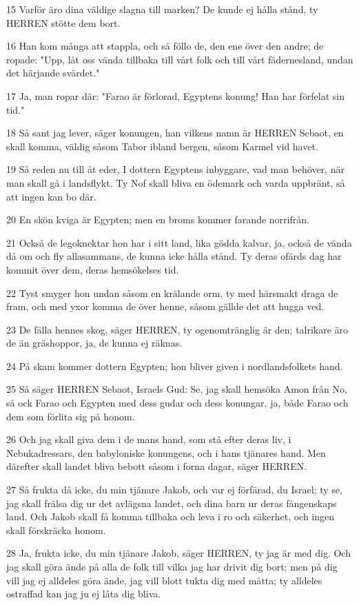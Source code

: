 \par 15 Varför äro dina väldige slagna till marken? De kunde ej hålla stånd, ty HERREN stötte dem bort.
\par 16 Han kom många att stappla, och så föllo de, den ene över den andre; de ropade: "Upp, låt oss vända tillbaka till vårt folk och till vårt fädernesland, undan det härjande svärdet."
\par 17 Ja, man ropar där: "Farao är förlorad, Egyptens konung! Han har förfelat sin tid."
\par 18 Så sant jag lever, säger konungen, han vilkens namn är HERREN Sebaot, en skall komma, väldig såsom Tabor ibland bergen, såsom Karmel vid havet.
\par 19 Så reden nu till åt eder, I dottern Egyptens inbyggare, vad man behöver, när man skall gå i landsflykt. Ty Nof skall bliva en ödemark och varda uppbränt, så att ingen kan bo där.
\par 20 En skön kviga är Egypten; men en broms kommer farande norrifrån.
\par 21 Också de legoknektar hon har i sitt land, lika gödda kalvar, ja, också de vända då om och fly allasammans, de kunna icke hålla stånd. Ty deras ofärds dag har kommit över dem, deras hemsökelses tid.
\par 22 Tyst smyger hon undan såsom en krälande orm, ty med härsmakt draga de fram, och med yxor komma de över henne, såsom gällde det att hugga ved.
\par 23 De fälla hennes skog, säger HERREN, ty ogenomtränglig är den; talrikare äro de än gräshoppor, ja, de kunna ej räknas.
\par 24 På skam kommer dottern Egypten; hon bliver given i nordlandsfolkets hand.
\par 25 Så säger HERREN Sebaot, Israels Gud: Se, jag skall hemsöka Amon från No, så ock Farao och Egypten med dess gudar och dess konungar, ja, både Farao och dem som förlita sig på honom.
\par 26 Och jag skall giva dem i de mans hand, som stå efter deras liv, i Nebukadressars, den babyloniske konungens, och i hans tjänares hand. Men därefter skall landet bliva bebott såsom i forna dagar, säger HERREN.
\par 27 Så frukta då icke, du min tjänare Jakob, och var ej förfärad, du Israel; ty se, jag skall frälsa dig ur det avlägsna landet, och dina barn ur deras fångenskaps land. Och Jakob skall få komma tillbaka och leva i ro och säkerhet, och ingen skall förskräcka honom.
\par 28 Ja, frukta icke, du min tjänare Jakob, säger HERREN, ty jag är med dig. Och jag skall göra ände på alla de folk till vilka jag har drivit dig bort; men på dig vill jag ej alldeles göra ände, jag vill blott tukta dig med måtta; ty alldeles ostraffad kan jag ju ej låta dig bliva.

